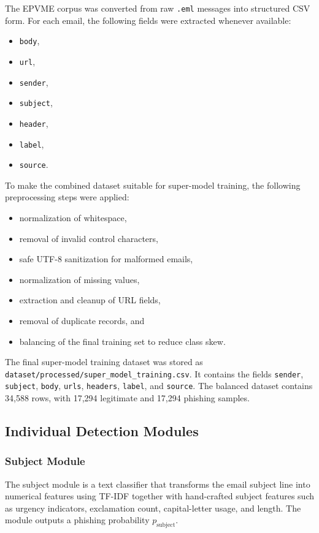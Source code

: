 The EPVME corpus was converted from raw \texttt{.eml} messages into structured CSV form. For each email, the following fields were extracted whenever available:
\begin{itemize}
  \item \texttt{body},
  \item \texttt{url},
  \item \texttt{sender},
  \item \texttt{subject},
  \item \texttt{header},
  \item \texttt{label},
  \item \texttt{source}.
\end{itemize}

To make the combined dataset suitable for super-model training, the following preprocessing steps were applied:
\begin{itemize}
  \item normalization of whitespace,
  \item removal of invalid control characters,
  \item safe UTF-8 sanitization for malformed emails,
  \item normalization of missing values,
  \item extraction and cleanup of URL fields,
  \item removal of duplicate records, and
  \item balancing of the final training set to reduce class skew.
\end{itemize}

The final super-model training dataset was stored as \texttt{dataset/processed/super\_model\_training.csv}. It contains the fields \texttt{sender}, \texttt{subject}, \texttt{body}, \texttt{urls}, \texttt{headers}, \texttt{label}, and \texttt{source}. The balanced dataset contains 34,588 rows, with 17,294 legitimate and 17,294 phishing samples.

\subsection{Individual Detection Modules}

\subsubsection{Subject Module}
The subject module is a text classifier that transforms the email subject line into numerical features using TF-IDF together with hand-crafted subject features such as urgency indicators, exclamation count, capital-letter usage, and length. The module outputs a phishing probability $p_{\text{subject}}$.

